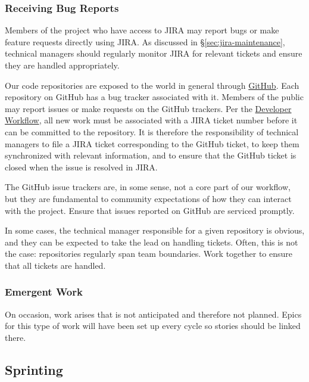 \subsubsection{Receiving Bug Reports}
\label{receiving-bug-reports}

Members of the project who have access to \gls{JIRA} may report bugs or make feature requests directly using \gls{JIRA}.
As discussed in \S\ref{sec:jira-maintenance}, technical managers should regularly monitor \gls{JIRA} for relevant tickets and ensure they are handled appropriately.

Our code repositories are exposed to the world in general through \href{https://github.com/lsst/}{GitHub}.
Each repository on GitHub has a bug tracker associated with it.
Members of the public may report issues or make requests on the GitHub trackers.
Per the \href{https://developer.lsst.io/processes/workflow.html}{Developer Workflow}, all new work must be associated with a \gls{JIRA} ticket number before it can be committed to the repository.
It is therefore the responsibility of technical managers to file a \gls{JIRA} ticket corresponding to the GitHub ticket, to keep them synchronized with relevant information, and to ensure that the GitHub ticket is closed when the issue is resolved in \gls{JIRA}.

The GitHub issue trackers are, in some sense, not a core part of our
workflow, but they are fundamental to community expectations of how they
can interact with the project. Ensure that issues reported on GitHub are
serviced promptly.

In some cases, the technical manager responsible for a given repository
is obvious, and they can be expected to take the lead on handling
tickets. Often, this is not the case: repositories regularly span team
boundaries. Work together to ensure that all tickets are handled.

\subsubsection{Emergent Work}
\label{emergent-work}

On occasion, work arises that is not anticipated and therefore not planned.  Epics for this type of work will have been set up every \gls{cycle} so stories should be linked there.


\subsection{Sprinting}
\label{sec:sprinting}

